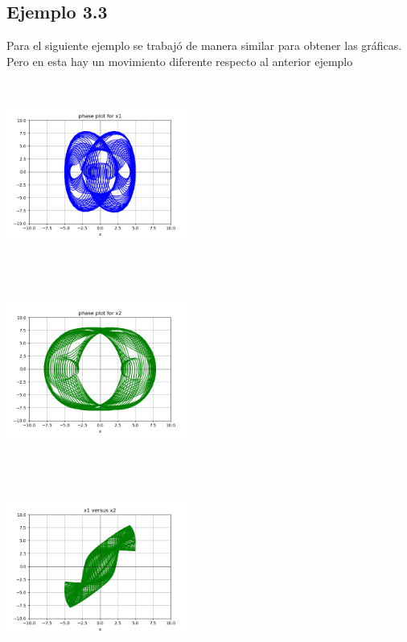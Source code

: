 \documentclass{article}
\begin{document}
\subsection{Ejemplo 3.3}

Para el siguiente ejemplo se trabajó de manera similar para obtener las gráficas. Pero en esta hay un movimiento diferente respecto al anterior ejemplo

\begin{center}
  \includegraphics[width=6cm, height=6cm]{ej3_31.png}
\end{center}

\begin{center}
  \includegraphics[width=6cm, height=6cm]{ej3_32.png}
\end{center}

\begin{center}
  \includegraphics[width=6cm, height=6cm]{ej3_33.png}
\end{center}
\end{document}
